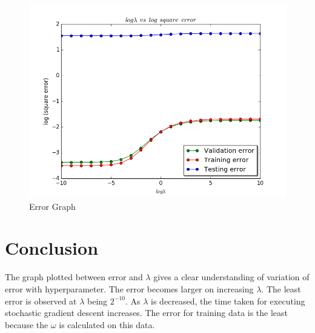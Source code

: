\documentclass[a4paper,11pt]{article}
\theoremstyle{mytheor}
\begin{document}
\begin{figure}
    \centering
    \includegraphics[width=\linewidth]{plot.png}
    \caption{Error Graph}
    \label{fig:Error Graph}
\end{figure}

\section*{Conclusion}

The graph plotted between error and \(\lambda\) gives a clear understanding of variation of error with hyperparameter. The error becomes larger on increasing \(\lambda\). The least error is observed at \({\lambda}\) being \({2^{-10}}\). As \(\lambda\) is decreased, the time taken for executing stochastic gradient descent increases. The error for training data is the least because the \(\omega\) is calculated on this data.
\end{document}
